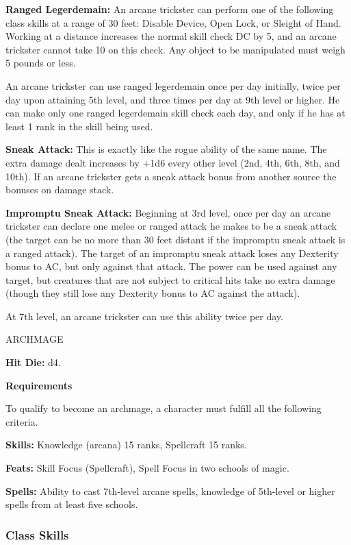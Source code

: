 \documentclass{article}
\begin{document}
\textbf{Ranged Legerdemain:} An arcane trickster can perform one of the following 
class skills at a range of 30 feet: Disable Device, Open Lock, or Sleight of Hand. 
Working at a distance increases the normal skill check DC by 5, and an arcane trickster 
cannot take 10 on this check. Any object to be manipulated must weigh 5 pounds 
or less.

An arcane trickster can use ranged legerdemain once per day initially, twice per 
day upon attaining 5th level, and three times per day at 9th level or higher. He 
can make only one ranged legerdemain skill check each day, and only if he has at 
least 1 rank in the skill being used.

\textbf{Sneak Attack:} This is exactly like the rogue ability of the same name. 
The extra damage dealt increases by +1d6 every other level (2nd, 4th, 6th, 8th, 
and 10th). If an arcane trickster gets a sneak attack bonus from another source 
the bonuses on damage stack.

\textbf{Impromptu Sneak Attack:} Beginning at 3rd level, once per day an arcane 
trickster can declare one melee or ranged attack he makes to be a sneak attack 
(the target can be no more than 30 feet distant if the impromptu sneak attack is 
a ranged attack). The target of an impromptu sneak attack loses any Dexterity bonus 
to AC, but only against that attack. The power can be used against any target, 
but creatures that are not subject to critical hits take no extra damage (though 
they still lose any Dexterity bonus to AC against the attack).

At 7th level, an arcane trickster can use this ability twice per day.

\vspace{12pt}
ARCHMAGE

\textbf{Hit Die:} d4.

\textbf{Requirements}

To qualify to become an archmage, a character must fulfill all the following criteria. 

\parindent=3pt
\textbf{Skills:} Knowledge (arcana) 15 ranks, Spellcraft 15 ranks.

\parindent=0pt
\textbf{Feats:} Skill Focus (Spellcraft), Spell Focus in two schools of magic.

\textbf{Spells:} Ability to cast 7th-level arcane spells, knowledge of 5th-level 
or higher spells from at least five schools.

\vspace{12pt}
\subsubsection*{\textbf{Class Skills}}
\end{document}
